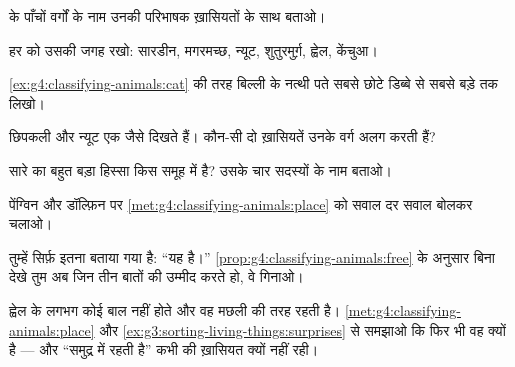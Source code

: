 \begin{exercise}[$\star$]\label{exo:g4:classifying-animals:2}
 के पाँचों वर्गों के नाम उनकी परिभाषक ख़ासियतों के साथ
बताओ।
\end{exercise}

\begin{exercise}[$\star$]\label{exo:g4:classifying-animals:3}
हर  को उसकी जगह रखो: सारडीन, मगरमच्छ, न्यूट, शुतुरमुर्ग़, ह्वेल,
केंचुआ।
\end{exercise}

\begin{exercise}[$\star$]\label{exo:g4:classifying-animals:4}
\cref{ex:g4:classifying-animals:cat} की तरह बिल्ली के नत्थी पते
सबसे छोटे डिब्बे से सबसे बड़े तक लिखो।
\end{exercise}

\begin{exercise}[$\star$]\label{exo:g4:classifying-animals:5}
छिपकली और न्यूट एक जैसे दिखते हैं। कौन-सी दो ख़ासियतें उनके वर्ग अलग
करती हैं?
\end{exercise}

\begin{exercise}[$\star$]\label{exo:g4:classifying-animals:6}
सारे  का बहुत बड़ा हिस्सा किस समूह में है? उसके चार सदस्यों के
नाम बताओ।
\end{exercise}

\begin{exercise}[$\star$]\label{exo:g4:classifying-animals:7}
पेंग्विन और डॉल्फ़िन पर \cref{met:g4:classifying-animals:place} को
सवाल दर सवाल बोलकर चलाओ।
\end{exercise}

\begin{exercise}[$\star$]\label{exo:g4:classifying-animals:8}
तुम्हें सिर्फ़ इतना बताया गया है: ``यह   है।''
\cref{prop:g4:classifying-animals:free} के अनुसार बिना देखे तुम अब
जिन तीन बातों की उम्मीद करते हो, वे गिनाओ।
\end{exercise}

\begin{exercise}[$\star\star$]\label{exo:g4:classifying-animals:9}
ह्वेल के लगभग कोई बाल नहीं होते और वह मछली की तरह रहती है।
\cref{met:g4:classifying-animals:place} और
\cref{ex:g3:sorting-living-things:surprises} से समझाओ कि फिर भी वह
 क्यों है --- और ``समुद्र में रहती है'' कभी  की
ख़ासियत क्यों नहीं रही।
\end{exercise}

